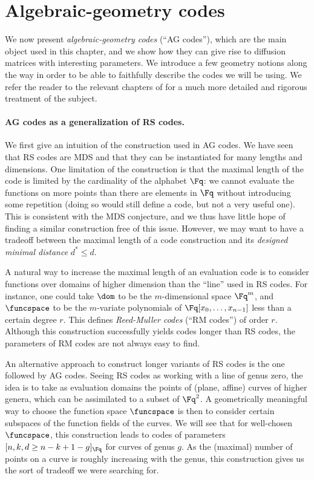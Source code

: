 \section{Algebraic-geometry codes}
\label{sec:ag}

We now present \emph{algebraic-geometry codes} (``AG codes''), which are the main object used in this chapter,
and we show how they can give rise to diffusion matrices with interesting parameters.
We introduce a few geometry notions along the way in order to be able to faithfully describe the codes we will
be using. 
We refer the reader to the relevant chapters of \cite{vanlint,tvn,stichtenoth,fulton} for a much more detailed and rigorous treatment of the subject. 

\paragraph{AG codes as a generalization of RS codes.}
We first give an intuition of the construction used in AG codes. We have seen that RS codes are MDS
and that they can be instantiated for many lengths and dimensions. One limitation of the construction
is that the maximal length of the code is limited by the cardinality of the alphabet $\Fq$: we
cannot evaluate the functions on more points than there are elements in $\Fq$ without introducing some
repetition (doing so would still define a code, but not a very useful one). This is consistent with the MDS conjecture,
and we thus have little hope of finding a similar construction free of this issue. However, we may want to
have a tradeoff between the maximal length of a code construction and its \emph{designed minimal distance} $d^* \leq d$.

A natural way to increase the maximal length of an evaluation code is to consider functions over domains
of higher dimension than the ``line'' used in RS codes. For instance, one could take $\dom$ to be the
$m$-dimensional space $\Fq^m$, and $\funcspace$ to be the $m$-variate polynomials of $\Fq[x_0,\ldots,x_{n-1}]$
less than a certain degree $r$. This defines \emph{Reed-Muller codes} (``RM codes'') of order $r$.
Although this construction successfully yields codes longer than RS codes, the parameters of RM codes
are not always easy to find.

An alternative approach to construct longer variants of RS codes is the one followed by AG codes. Seeing
RS codes as working with a line of genus zero, the idea is to take as evaluation domains
the points of (plane, affine) curves of higher genera, which can be assimilated to a subset of $\Fq^2$. A geometrically
meaningful way to choose the function space $\funcspace$ is then to consider certain subspaces of
the function fields of the curves. We will see that for well-chosen $\funcspace$, this construction
leads to codes of parameters $[n, k, d \geq n - k + 1 - g]_{\Fq}$ for curves of genus $g$. As the
(maximal) number of points on a curve is roughly increasing with the genus, this construction gives us the
sort of tradeoff we were searching for.

